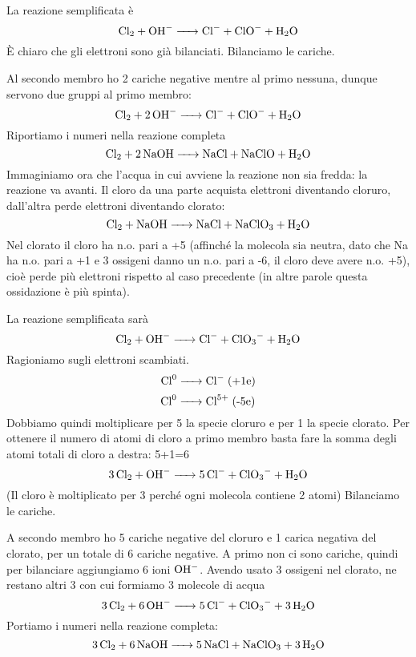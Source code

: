 La reazione semplificata è
$$\ce{Cl_2 + OH- -> Cl- + ClO- + H_2O}$$
È chiaro che gli elettroni sono già bilanciati. Bilanciamo le cariche.

Al secondo membro ho 2 cariche negative mentre al primo nessuna, dunque servono due gruppi  al primo membro:
$$\ce{Cl_2 + 2OH- -> Cl- + ClO- + H_2O}$$
Riportiamo i numeri nella reazione completa
$$\ce{Cl_2 + 2NaOH -> NaCl + NaClO + H_2O}$$
Immaginiamo ora che l'acqua in cui avviene la reazione non sia fredda: la reazione va avanti. Il cloro da una parte acquista elettroni diventando cloruro, dall'altra perde elettroni diventando clorato:
$$\ce{Cl_2 + NaOH -> NaCl + NaClO_3 + H_2O}$$
Nel clorato il cloro ha n.o. pari a +5 (affinché la molecola  sia neutra, dato che Na ha n.o. pari a +1 e 3 ossigeni danno un n.o. pari a -6, il cloro deve avere n.o. +5), cioè perde più elettroni rispetto al caso precedente (in altre parole questa ossidazione è più spinta).

La reazione semplificata sarà
$$\ce{Cl_2 + OH- -> Cl- + ClO_3- + H_2O}$$
Ragioniamo sugli elettroni scambiati.
$$\ce{Cl^0 ->Cl-} \; \text{(+1e)}$$
$$\ce{Cl^0 ->Cl^5+} \; \text{(-5e)}$$
Dobbiamo quindi moltiplicare per 5 la specie cloruro e per 1 la specie clorato. Per ottenere il numero di atomi di cloro a primo membro basta fare la somma degli atomi totali di cloro a destra: 5+1=6
$$\ce{3Cl_2 + OH- -> 5Cl- + ClO_3- + H_2O}$$
(Il cloro è moltiplicato per 3 perché ogni molecola contiene 2 atomi)
Bilanciamo le cariche.

A secondo membro ho 5 cariche negative del cloruro e 1 carica negativa del clorato, per un totale di 6 cariche negative. A primo non ci sono cariche, quindi per bilanciare aggiungiamo 6 ioni $\rm OH^-$. Avendo usato 3 ossigeni nel clorato, ne restano altri 3 con cui formiamo 3 molecole di acqua
$$\ce{3Cl_2 + 6OH- -> 5Cl- + ClO_3- + 3H_2O}$$
Portiamo i numeri nella reazione completa:
$$\ce{3Cl_2 + 6NaOH -> 5NaCl + NaClO_3 + 3H_2O}$$